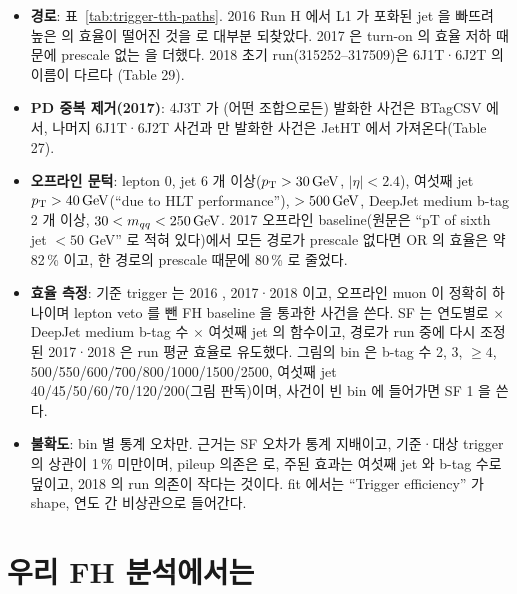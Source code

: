 \begin{itemize}
\item \textbf{경로}: 표~\ref{tab:trigger-tth-paths}. 2016 Run H 에서 L1 \HT{} 가 포화된 jet 을 빠뜨려 높은 \HT{} 의 효율이 떨어진 것을
   로 대부분 되찾았다. 2017 은 \HT{} turn-on 의 효율 저하 때문에 prescale 없는
   을 더했다. 2018 초기 run(315252–317509)은 6J1T·6J2T 의 이름이 다르다
  (Table 29).
\item \textbf{PD 중복 제거(2017)}: 4J3T 가 (어떤 조합으로든) 발화한 사건은 BTagCSV 에서, 나머지 6J1T·6J2T 사건과
   만 발화한 사건은 JetHT 에서 가져온다(Table 27).
\item \textbf{오프라인 문턱}: lepton 0, jet 6 개 이상($p_{\mathrm{T}}>30\,\mathrm{GeV}$, $|\eta|<2.4$), 여섯째 jet $p_{\mathrm{T}}>40\,\mathrm{GeV}$(``due to HLT performance''),
  \HT{} $>500\,\mathrm{GeV}$, DeepJet medium b-tag 2 개 이상, $30<m_{qq}<250\,\mathrm{GeV}$.
  2017 오프라인 baseline(원문은 ``pT of sixth jet $<50$ GeV'' 로 적혀 있다)에서 모든 경로가 prescale 없다면 OR 의 효율은 약 82\,\%
  이고, 한 경로의 prescale 때문에 80\,\% 로 줄었다.
\item \textbf{효율 측정}: 기준 trigger 는 2016 , 2017·2018  이고, 오프라인 muon 이 정확히 하나이며
  lepton veto 를 뺀 FH baseline 을 통과한 사건을 쓴다. SF 는 연도별로 \HT{} $\times$ DeepJet medium
  b-tag 수 $\times$ 여섯째 jet \pt{} 의 함수이고, 경로가 run 중에 다시 조정된 2017·2018 은 run 평균 효율로 유도했다. 그림의 bin 은
  b-tag 수 2, 3, $\geq 4$, \HT{} 500/550/600/700/800/1000/1500/2500, 여섯째 jet \pt{} 40/45/50/60/70/120/200\GeV{}(그림 판독)이며,
  사건이 빈 bin 에 들어가면 SF 1 을 쓴다.
\item \textbf{불확도}: bin 별 통계 오차만. 근거는 SF 오차가 통계 지배이고, 기준·대상 trigger 의 상관이 1\,\% 미만이며, pileup 의존은
  \HT{} 로, 주된 효과는 여섯째 jet \pt{} 와 b-tag 수로 덮이고, 2018 의 run 의존이 작다는 것이다.
  fit 에서는 ``Trigger efficiency'' 가 shape, 연도 간 비상관으로 들어간다.
\end{itemize}

\section{우리 FH 분석에서는}\label{sec:trigger-ours}

